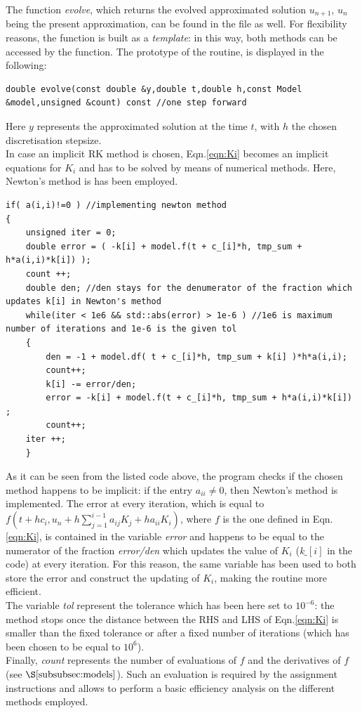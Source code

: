 \documentclass[11pt]{article}
\theoremstyle{theorem}
\theoremstyle{definition}
\begin{document}
The function \emph{evolve}, which returns the evolved approximated solution $u_{n+1}$, $u_n$ being the present approximation, can be found in the file as well. For flexibility reasons, the function is built as a \emph{template}: in this way, both methods can be accessed by the function. The prototype of the routine, is displayed in the following:

\begin{lstlisting}
double evolve(const double &y,double t,double h,const Model &model,unsigned &count) const //one step forward
\end{lstlisting}

Here $y$ represents the approximated solution at the time $t$, with $h$ the chosen discretisation stepsize.\\
In case an implicit RK method is chosen, Eqn.\ref{eqn:Ki} becomes an implicit equations for $K_i$ and has to be solved by means of numerical methods. Here, Newton's method is has been employed.\\

\begin{lstlisting}
if( a(i,i)!=0 ) //implementing newton method
{
	unsigned iter = 0;
	double error = ( -k[i] + model.f(t + c_[i]*h, tmp_sum + h*a(i,i)*k[i]) );
	count ++;
	double den; //den stays for the denumerator of the fraction which updates k[i] in Newton's method
	while(iter < 1e6 && std::abs(error) > 1e-6 ) //1e6 is maximum number of iterations and 1e-6 is the given tol
	{
		den = -1 + model.df( t + c_[i]*h, tmp_sum + k[i] )*h*a(i,i);
		count++;
		k[i] -= error/den;
		error = -k[i] + model.f(t + c_[i]*h, tmp_sum + h*a(i,i)*k[i]) ;
		count++;
	iter ++;
	}
\end{lstlisting}

As it can be seen from the listed code above, the program checks if the chosen method happens to be implicit: if the entry $a_{ii}\neq 0$, then Newton's method is implemented. The error at every iteration, which is equal to $f\left(t+hc_i, u_n+h\sum_{j=1}^{i-1}a_{ij}K_j+ha_{ii}K_i\right)$, where $f$ is the one defined in Eqn.\eqref{eqn:Ki}, is contained in the variable \emph{error} and happens to be equal to the numerator of the fraction \emph{error/den} which updates the value of $K_i$ (\emph{k$\_[i]$} in the code) at every iteration. For this reason, the same variable has been used to both store the error and construct the updating of $K_i$, making the routine more efficient.\\
The variable \emph{tol} represent the tolerance which has been here set to $10^{-6}$: the method stops once the distance between the RHS and LHS of Eqn.\eqref{eqn:Ki} is smaller than the fixed tolerance or after a fixed number of iterations (which has been chosen to be equal to $10^6$).\\
Finally, \emph{count} represents the number of evaluations of $f$ and the derivatives of $f$ (see $\S\ref{subsubsec:models}$). Such an evaluation is required by the assignment instructions and allows to perform a basic efficiency analysis on the different methods employed.\\ 
\end{document}
